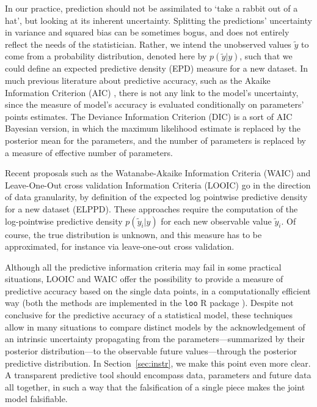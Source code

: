 \documentclass{statsoc}
\begin{document}
In our practice, prediction should not be assimilated to `take a rabbit out of a hat', but looking at its inherent uncertainty. Splitting the predictions' uncertainty in variance and 
squared bias can be sometimes bogus, and does not entirely reflect the needs of the statistician. Rather, we intend the unobserved values $\tilde{y}$ to come from a 
probability distribution, denoted here by $p(\tilde{y}|y)$, such that we could define an expected predictive density (EPD) measure for a new dataset.  In much previous literature 
about predictive accuracy, such as the Akaike Information Criterion (AIC) \citep{akaike1973information}, there is not any link to the model's uncertainty, since the 
measure of model's accuracy is evaluated conditionally on parameters' points estimates. The Deviance Information Criterion (DIC) \citep{spiegelhalter2002bayesian} is a sort of AIC 
Bayesian version, in which the maximum likelihood estimate is replaced by the posterior mean for the parameters, and the number of parameters is replaced by a measure of effective number of parameters. 

Recent proposals such as the Watanabe-Akaike Information Criteria (WAIC) \citep{watanabe2010asymptotic} and Leave-One-Out cross validation Information Criteria (LOOIC) \citep{vehtari2017practical} go in the direction of data granularity, by definition of the expected log pointwise predictive density
for a new dataset (ELPPD). These approaches require the computation of the log-pointwise predictive density $p(\tilde{y}_{i}|y)$ for each new observable value $\tilde{y}_i$. Of course, the true distribution is unknown, and this measure has to be approximated, for instance via leave-one-out cross validation.

Although all the predictive information criteria may fail in some practical situations, LOOIC and WAIC offer the possibility to provide a measure of predictive accuracy based on the single data points, in a computationally efficient way (both the methods are 
implemented in the {\tt loo} R package \citep{loo}). Despite not conclusive for the predictive accuracy of a statistical model, these techniques allow in many situations to compare distinct models by the acknowledgement of an intrinsic uncertainty propagating from the parameters---summarized by their posterior distribution---to the observable future values---through the posterior predictive distribution.
In Section~\ref{sec:instr}, we make this point even more clear. A transparent predictive tool should encompass data, parameters and future data all together, in such a way that the falsification of a single piece makes the joint model falsifiable.
\end{document}
